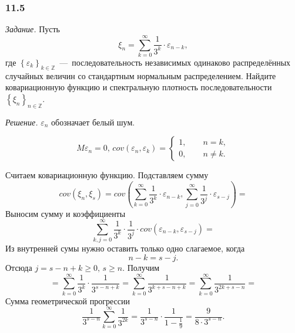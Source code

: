 \subsubsection*{11.5}

\textit{Задание.}
Пусть
\begin{equation*}
  \xi_n =
  \sum \limits_{k = 0}^{ \infty } \frac{1}{3^k} \cdot \varepsilon_{n - k},
\end{equation*}
где $ \left\{ \varepsilon_k \right\}_{k \in \mathbb{Z}}$~---~последовательность
независимых одинаково распределённых случайных величин со стандартным нормальным распределением.
Найдите ковариационную функцию и спектральную плотность последовательности
$ \left\{ \xi_n \right\}_{n \in \mathbb{Z}}$.

\textit{Решение.}
$ \varepsilon_n$ обозначает белый шум.

\begin{equation*}
  M \varepsilon_n = 0, \,
  cov \left( \varepsilon_n, \varepsilon_k \right) =
  \begin{cases}
    1, \qquad n = k, \\
    0, \qquad n \neq k.
  \end{cases}
\end{equation*}

Считаем ковариационную функцию.
Подставляем сумму
\begin{equation*}
  cov \left( \xi_n, \xi_s \right) =
  cov \left(
    \sum \limits_{k = 0}^{ \infty } \frac{1}{3^k} \cdot \varepsilon_{n - k},
    \sum \limits_{j = 0}^{ \infty } \frac{1}{3^j} \cdot \varepsilon_{s - j}
  \right) =
\end{equation*}
Выносим сумму и коэффициенты
\begin{equation*}
  \sum \limits_{k, j = 0}^{ \infty }
    \frac{1}{3^k} \cdot \frac{1}{3^j} \cdot
    cov \left( \varepsilon_{n - k}, \varepsilon_{s - j} \right) =
\end{equation*}
Из внутренней сумы нужно оставить только одно слагаемое, когда
\begin{equation*}
  n - k =
  s - j.
\end{equation*}
Отсюда $j = s - n + k \geq 0, \, s \geq n$.
Получим
\begin{equation*}
  = \sum \limits_{k = 0}^{ \infty } \frac{1}{3^k} \cdot \frac{1}{3^{s - n + k}} =
  \sum \limits_{k = 0}^{ \infty } \frac{1}{3^{k + s - n + k}} =
  \sum \limits_{k = 0}^{ \infty } \frac{1}{3^{2k + s - n}} =
\end{equation*}
Сумма геометрической прогрессии
\begin{equation*}
  \frac{1}{3^{s - n}} \sum \limits_{k = 0}^{ \infty } \frac{1}{3^{2k}} =
  \frac{1}{3^{s - n}} \cdot \frac{1}{1 - \frac{1}{9}} =
  \frac{9}{8 \cdot 3^{s - n}}.
\end{equation*}

